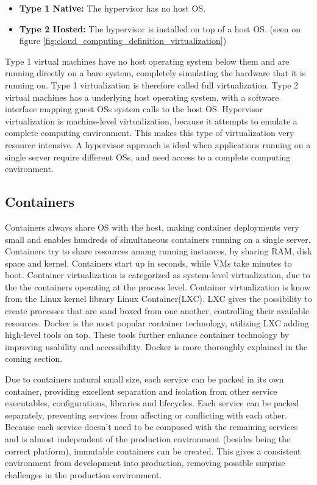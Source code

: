 \begin{itemize}
	\item \textbf{Type 1 Native:} The hypervisor has no host OS.
	\item \textbf{Type 2 Hosted:} The hypervisor is installed on top of a host OS. (seen on figure \ref{fig:cloud_computing_definition_virtualization})
\end{itemize}

Type 1 virtual machines have no host operating system below them and are running directly on a bare system, completely simulating the hardware that it is running on. Type 1 virtualization is therefore called full virtualization. Type 2 virtual machines has a underlying host operating system, with a software interface mapping guest OSs system calls to the host OS. Hypervisor virtualization is machine-level virtualization, because it attempts to emulate a complete computing environment\cite{fink2014docker}. This makes this type of virtualization very resource intensive. A hypervisor approach is ideal when applications running on a single server require different OSs, and need access to a complete computing environment.

\subsection{Containers}
Containers always share OS with the host, making container deployments very small and enables hundreds of simultaneous containers running on a single server. Containers try to share resources among running instances, by sharing RAM, disk space and kernel. Containers start up in seconds, while VMs take minutes to boot\cite{dockerFAQ}. Container virtualization is categorized as system-level virtualization, due to the the containers operating at the process level. Container virtualization is know from the Linux kernel library Linux Container(LXC). LXC gives the possibility to create processes that are sand boxed from one another, controlling their available resources. Docker is the most popular container technology, utilizing LXC adding high-level tools on top. These tools further enhance container technology by improving usability and accessibility. Docker is more thoroughly explained in the coming section. 

Due to containers natural small size, each service can be packed in its own container, providing excellent separation and isolation from other service executables, configurations, libraries and lifecycles. Each service can be packed separately, preventing services from affecting or conflicting with each other. Because each service doesn't need to be composed with the remaining services and is almost independent of the production environment (besides being the correct platform), immutable containers can be created\cite{kubernetes_what_is}. This gives a consistent environment from development into production, removing possible surprise challenges in the production environment.


